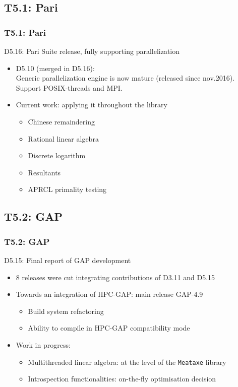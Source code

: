 \documentclass{beamer}
\begin{document}
\subsection{T5.1: Pari}
\begin{frame}
  \frametitle{T5.1: Pari}
  \begin{block} {D5.16: Pari Suite release, fully supporting parallelization}
    \begin{itemize}
    \item D5.10 (merged in D5.16):\\ Generic parallelization engine is now mature
      (released since nov.2016). Support POSIX-threads and MPI.
    \item Current work: applying it throughout the library
      \begin{itemize}
      \item Chinese remaindering
      \item Rational linear algebra
      \item Discrete logarithm
      \item Resultants
      \item APRCL primality testing
      \end{itemize}
      
      
    \end{itemize}
  \end{block}
\end{frame}

\subsection{T5.2: GAP}
\begin{frame}
  \frametitle{T5.2: GAP}
  \begin{block} {D5.15: Final report of GAP development}
    \begin{itemize}
    \item 8 releases were cut integrating contributions of D3.11 and D5.15
    \item Towards an integration of HPC-GAP: main release GAP-4.9
      \begin{itemize}
      \item Build system refactoring
      \item Ability to compile in HPC-GAP compatibility mode
      \end{itemize}
    \item Work in progress:
      \begin{itemize}
      \item  Multithreaded linear algebra: at the level of the \texttt{Meataxe} library
      \item Introspection functionalities: on-the-fly optimisation decision
      \end{itemize}
    \end{itemize}
  \end{block}
\end{frame}
\end{document}
